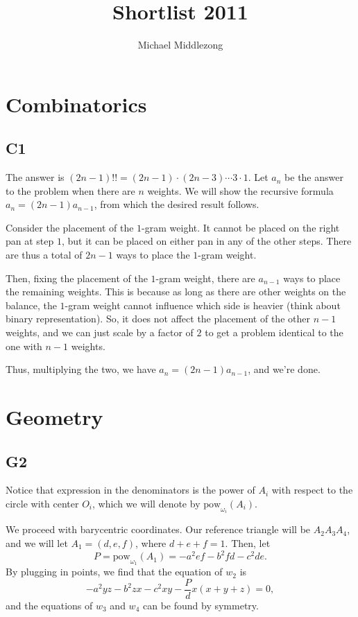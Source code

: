 \documentclass{scrartcl}
\title{Shortlist 2011}
\author{Michael Middlezong}
\begin{document}
\maketitle

\section*{Combinatorics}
\subsection*{C1}
The answer is $(2n-1)!! = (2n-1) \cdot (2n-3) \cdots 3 \cdot 1$.
Let $a_n$ be the answer to the problem when there are $n$ weights.
We will show the recursive formula $a_n = (2n-1)a_{n-1}$, from which the desired result follows.

Consider the placement of the $1$-gram weight.
It cannot be placed on the right pan at step $1$, but it can be placed on either pan in any of the other steps.
There are thus a total of $2n-1$ ways to place the $1$-gram weight.

Then, fixing the placement of the $1$-gram weight, there are $a_{n-1}$ ways to place the remaining weights.
This is because as long as there are other weights on the balance, the $1$-gram weight cannot influence which side is heavier (think about binary representation).
So, it does not affect the placement of the other $n-1$ weights, and we can just scale by a factor of $2$ to get a problem identical to the one with $n-1$ weights.

Thus, multiplying the two, we have $a_n = (2n-1)a_{n-1}$, and we're done.

\section*{Geometry}
\subsection*{G2}
Notice that expression in the denominators is the power of $A_i$ with respect to the circle with center $O_i$, which we will denote by $\text{pow}_{\omega_i}(A_i)$.

We proceed with barycentric coordinates.
Our reference triangle will be $A_2A_3A_4$, and we will let $A_1 = (d,e,f)$, where $d+e+f=1$.
Then, let
\[ P = \text{pow}_{\omega_1}(A_1) = -a^2ef-b^2fd-c^2de. \]
By plugging in points, we find that the equation of $w_2$ is
\[ -a^2yz-b^2zx-c^2xy-\frac{P}{d}x(x+y+z) = 0, \]
and the equations of $w_3$ and $w_4$ can be found by symmetry.
\end{document}
